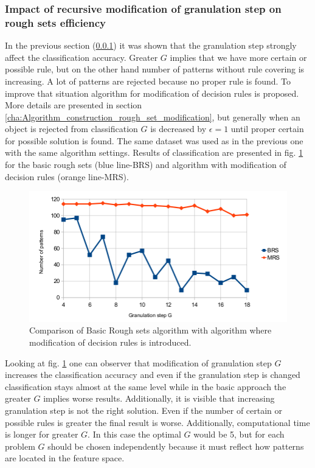 \subsubsection{Impact of recursive modification of granulation step on rough sets
efficiency}
\label{cha:Simulation_reaearch_2}
In the previous section (\ref{cha:Simulation_reaearch_2}) it was shown that the
granulation step strongly affect the classification accuracy.
Greater $G$ implies that we have more certain or possible rule, but on the
other hand number of patterns without rule covering is increasing. A lot of
patterns are rejected because no proper rule is found. To improve that
situation algorithm for modification of decision rules is proposed. More
details are presented in section
\ref{cha:Algorithm_construction_rough_set_modification}, but generally when an
object is rejected from classification $G$ is decreased by $\epsilon=1$ until 
proper certain for possible solution is found. The same dataset was used as in
the previous one with the same algorithm settings. Results of classification
are presented in fig. \ref{fig:Simulation_research_2} for the basic rough
sets (blue line-BRS) and algorithm with modification of decision rules (orange
line-MRS).
\begin{figure}[H]
    \begin{center}
        \includegraphics[width=\textwidth]{fig/rough_chart.png}
    \end{center}
    \caption{Comparison of Basic Rough sets algorithm with algorithm where
    modification of decision rules is introduced.}
    \label{fig:Simulation_research_2}
\end{figure}

Looking at fig. \ref{fig:Simulation_research_2} one can observer that
modification of granulation step $G$ increases the classification accuracy and
even if the granulation step is changed classification stays almost at the same
level while in the basic approach the greater $G$ implies worse results.
Additionally, it is visible that increasing granulation step is not the right
solution. Even if the number of certain or possible rules is greater the final
result is worse. Additionally, computational time is longer for greater $G$. In
this case the optimal $G$ would be 5, but for each problem $G$ should be chosen
independently because it must reflect how patterns are located in the feature
space.

